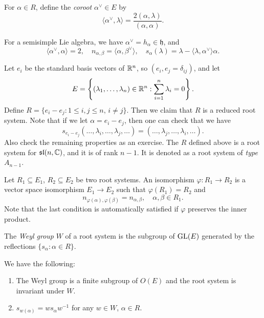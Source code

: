\begin{definition}
  For $\alpha \in R$, define the
  \emph{coroot}
  $\alpha^\vee \in E$ by
  \[
    \langle \alpha^\vee, \lambda \rangle
    = \frac{2(\alpha, \lambda)}{(\alpha, \alpha)}.
  \]
\end{definition}

\begin{remark}
  For a semisimple Lie algebra, we have
  $\alpha^\vee = h_{\alpha} \in \mathfrak{h}$,
  and
  \[
    \langle \alpha^\vee, \alpha \rangle
    = 2, \quad
    n_{\alpha, \beta}
    = \langle \alpha, \beta^\vee \rangle,
    \quad
    s_\alpha(\lambda)
    = \lambda - \langle \lambda, \alpha^\vee \rangle \alpha.
  \]
\end{remark}

\begin{example}
  Let $e_i$ be the standard basis vectors
  of $\mathbb{R}^n$, so
  $(e_i, e_j = \delta_{ij})$, and let
  \[
    E =
    \left\{
      (\lambda_1, \ldots, \lambda_n) \in \mathbb{R}^n :
      \sum_{i=1}^n \lambda_i = 0
    \right\}.
  \]
  Define $R = \{e_i - e_j : 1 \le i, j \le n,\, i \ne j\}$.
  Then we claim that
  $R$ is a reduced root system. Note that
  if we let
  $\alpha = e_i - e_j$, then one can check
  that we have
  \[
    s_{e_i - e_j}(\dots, \lambda_i, \dots, \lambda_j, \dots)
    = (\dots, \lambda_j, \dots, \lambda_i, \dots).
  \]
  Also check the remaining properties as
  an exercise.
  The $R$ defined above is a root system for
  $\mathfrak{sl}(n, \mathbb{C})$, and it is of rank
  $n - 1$. It is denoted as a root system
  of \emph{type $A_{n - 1}$}.
\end{example}

\begin{definition}
  Let $R_1 \subseteq E_1$, $R_2 \subseteq E_2$
  be two root systems. An
  isomorphism $\varphi : R_1 \to R_2$
  is a vector space isomorphism
  $E_1 \to E_2$ such that
  $\varphi(R_1) = R_2$ and
  \[
    n_{\varphi(\alpha), \varphi(\beta)}
    = n_{\alpha, \beta}, \quad
    \alpha, \beta \in R_1.
  \]
  Note that the last condition is
  automatically satisfied if $\varphi$
  preserves the inner product.
\end{definition}

\begin{definition}
  The \emph{Weyl group} $W$ of a
  root system is the subgroup of
  $\operatorname{GL}(E)$ generated by the
  reflections $\{s_\alpha : \alpha \in R\}$.
\end{definition}

\begin{lemma}
  We have the following:
  \begin{enumerate}
    \item The Weyl group
      is a finite subgroup of $O(E)$
      and the root system is invariant
      under $W$.
    \item $s_{w(\alpha)} = w s_\alpha w^{-1}$
      for any $w \in W$,
      $\alpha \in R$.
  \end{enumerate}
\end{lemma}

